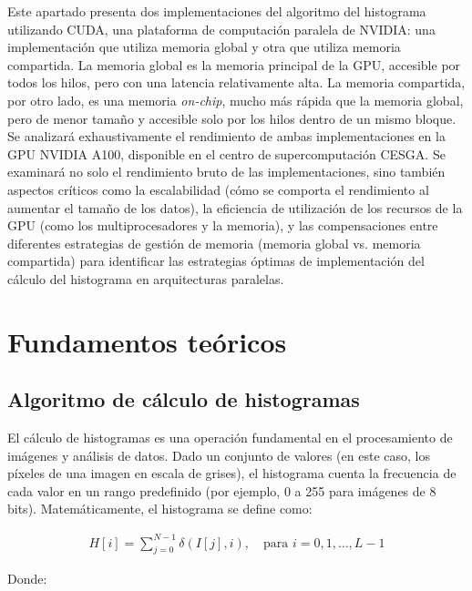     Este apartado presenta dos implementaciones del algoritmo del histograma utilizando CUDA, una plataforma de computación paralela de NVIDIA: una implementación que utiliza memoria global y otra que utiliza memoria compartida. La memoria global es la memoria principal de la GPU, accesible por todos los hilos, pero con una latencia relativamente alta. La memoria compartida, por otro lado, es una memoria \textit{on-chip}, mucho más rápida que la memoria global, pero de menor tamaño y accesible solo por los hilos dentro de un mismo bloque. Se analizará exhaustivamente el rendimiento de ambas implementaciones en la GPU NVIDIA A100, disponible en el centro de supercomputación CESGA. Se examinará no solo el rendimiento bruto de las implementaciones, sino también aspectos críticos como la escalabilidad (cómo se comporta el rendimiento al aumentar el tamaño de los datos), la eficiencia de utilización de los recursos de la GPU (como los multiprocesadores y la memoria), y las compensaciones entre diferentes estrategias de gestión de memoria (memoria global vs. memoria compartida) para identificar las estrategias óptimas de implementación del cálculo del histograma en arquitecturas paralelas.

\newpage

\section{Fundamentos teóricos}

    \subsection{Algoritmo de cálculo de histogramas}

        El cálculo de histogramas es una operación fundamental en el procesamiento de imágenes y análisis de datos. Dado un conjunto de valores (en este caso, los píxeles de una imagen en escala de grises), el histograma cuenta la frecuencia de cada valor en un rango predefinido (por ejemplo, 0 a 255 para imágenes de 8 bits). Matemáticamente, el histograma se define como:

        \begin{align}
            H[i] = \sum_{j=0}^{N-1} \delta(I[j], i), \quad \text{para } i = 0, 1, \ldots, L-1
        \end{align}

        Donde:

